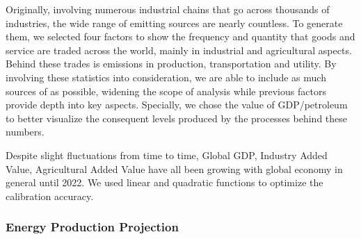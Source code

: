 \documentclass[12pt]{article}
\begin{document}
Originally, involving numerous industrial chains that go across thousands of industries, the wide range of emitting sources are nearly countless. To generate them, we selected four factors to show the frequency and quantity that goods and service are traded across the world, mainly in industrial and agricultural aspects. Behind these trades is  emissions in production, transportation and utility. By involving these statistics into consideration, we are able to include as much sources of  as possible, widening the scope of analysis while previous factors provide depth into key aspects. Specially, we chose the value of GDP/petroleum to better visualize the consequent  levels produced by the processes behind these numbers. 

Despite slight fluctuations from time to time, Global GDP, Industry Added Value, Agricultural Added Value have all been growing with global economy in general until 2022. We used linear and quadratic functions to optimize the calibration accuracy. 


\subsubsection*{Energy Production Projection}
\end{document}

